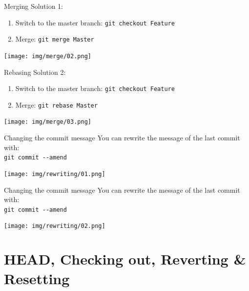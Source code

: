 \documentclass[usenames,dvipsnames,9pt]{beamer}
\begin{document}
\begin{frame}{Merging}
Solution 1:
\begin{enumerate}
  \item Switch to the master branch: \lstinline|git checkout Feature|
  \item Merge: \lstinline|git merge Master|
\end{enumerate}
\texttt{[image: img/merge/02.png]}
\end{frame}

\begin{frame}{Rebasing}
Solution 2:
\begin{enumerate}
  \item Switch to the master branch: \lstinline|git checkout Feature|
  \item Merge: \lstinline|git rebase Master|
\end{enumerate}
\texttt{[image: img/merge/03.png]}
\vspace{-0.06cm}
\end{frame}


\begin{frame}{Changing the commit message}
  You can rewrite the message of the last commit with:\\
  \lstinline|git commit --amend|

  \vspace{0.5cm}
  \texttt{[image: img/rewriting/01.png]}
\end{frame}
\begin{frame}{Changing the commit message}
  You can rewrite the message of the last commit with:\\
  \lstinline|git commit --amend|

  \vspace{0.5cm}
  \texttt{[image: img/rewriting/02.png]}
\end{frame}

%
%

\section{HEAD, Checking out, Reverting \& Resetting}
\end{document}
